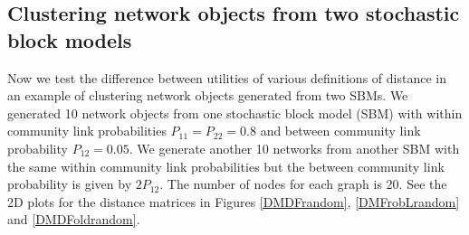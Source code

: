 \documentclass{amsart}
\begin{document}
	
%	
	
	

\subsection{Clustering network objects from two stochastic block models}
Now we test the difference between utilities of  various definitions of distance in an example of clustering network objects generated from two SBMs.  
 We generated 10 network objects from one stochastic block model (SBM) with within community link probabilities $P_{11}=P_{22}=0.8$  and  between community link probability $P_{12}=0.05$.  We generate another 10 networks from another SBM with the same within community link probabilities but the between community link probability is given by $2P_{12}$. The number of nodes for each graph is 20. 
See the 2D plots for the distance matrices in Figures \ref{DMDFrandom}, \ref{DMFrobLrandom} and \ref{DMDFoldrandom}. 
\end{document}
